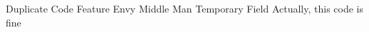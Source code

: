 \documentclass{exam}
\begin{document}
\begin{questions}
\begin{choices}
\choice Duplicate Code
\correctchoice Feature Envy
\choice Middle Man
\choice Temporary Field
\choice Actually, this code is fine
\end{choices}








\end{questions}
\end{document}
